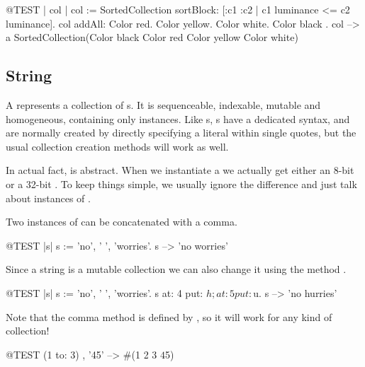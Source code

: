 \documentclass[a4paper,10pt,twoside]{book}
\begin{document}
\begin{code}{@TEST | col |}
col := SortedCollection sortBlock: [:c1 :c2 | c1 luminance <= c2 luminance].
col addAll: { Color red. Color yellow. Color white. Color black }.
col --> a SortedCollection(Color black Color red Color yellow Color white)
\end{code}

\subsection{String}
A \st {} represents a collection of s.
It is sequenceable, indexable, mutable and homogeneous, containing only  instances.
Like s, s have a dedicated syntax, and are normally created by directly specifying a  literal within single quotes, but the usual collection creation methods will work as well.


In actual fact,  is abstract.
When we instantiate a  we actually get either an 8-bit  or a 32-bit .
To keep things simple, we usually ignore the difference and just talk about instances of .

Two instances of  can be concatenated with a comma.
\begin{code}{@TEST |s|}
s := 'no', ' ', 'worries'.
s -->  'no worries'
\end{code}

Since a string is a mutable collection we can also change it using the method .

\begin{code}{@TEST |s| s := 'no', ' ', 'worries'.}
s at: 4 put: $h; at: 5 put: $u.
s --> 'no hurries'
\end{code}

Note that the comma method is defined by , so it will work for any kind of collection!
\begin{code}{@TEST}
(1 to: 3) , '45' --> #(1 2 3 $4 $5)
\end{code}
\end{document}
